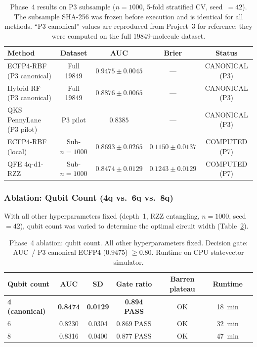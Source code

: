 \begin{table}[htbp]
\centering
\caption{Phase~4 results on P3 subsample ($n = 1000$, 5-fold stratified CV,
seed~$= 42$). The subsample SHA-256 was frozen before execution
and is identical for all methods.
``P3 canonical'' values are reproduced from Project~3\protect\cite{sao2026p3}
for reference; they were computed on the full \num{19849}-molecule dataset.}
\label{tab:phase4_results}
\begin{tabular}{lcccc}
\toprule
Method & Dataset & AUC & Brier & Status \\
\midrule
ECFP4-RBF (P3 canonical)
  & Full \num{19849} & $0.9475 \pm 0.0045$ & --- & CANONICAL (P3) \\
Hybrid RF (P3 canonical)
  & Full \num{19849} & $0.8876 \pm 0.0065$ & --- & CANONICAL (P3) \\
QKS PennyLane (P3 pilot)
  & P3 pilot & $0.8385$ & --- & CANONICAL (P3) \\
\midrule
ECFP4-RBF (local)
  & Sub-$n = 1000$ & $0.8693 \pm 0.0265$ & $0.1150 \pm 0.0137$ & COMPUTED (P7) \\
QFE 4q-d1-RZZ
  & Sub-$n = 1000$ & $\mathbf{0.8474 \pm 0.0129}$ & $0.1243 \pm 0.0129$ & COMPUTED (P7) \\
\bottomrule
\end{tabular}
\end{table}

\subsubsection{Ablation: Qubit Count (4q vs.\ 6q vs.\ 8q)}

With all other hyperparameters fixed (depth~1, RZZ entangling, $n = 1000$,
seed~$= 42$), qubit count was varied to determine the optimal circuit width
(Table~\ref{tab:ablation}).

\begin{table}[htbp]
\centering
\caption{Phase~4 ablation: qubit count. All other hyperparameters fixed.
Decision gate: AUC~/ P3 canonical ECFP4 ($0.9475$) $\geq 0.80$.
Runtime on CPU statevector simulator.}
\label{tab:ablation}
\begin{tabular}{lcccccc}
\toprule
Qubit count & AUC & SD & Gate ratio & Barren plateau & Runtime \\
\midrule
\textbf{4 (canonical)} & \textbf{0.8474} & \textbf{0.0129} & \textbf{0.894 PASS} & OK & \qty{18}{\minute} \\
6 & 0.8230 & 0.0304 & 0.869 PASS & OK & \qty{32}{\minute} \\
8 & 0.8316 & 0.0400 & 0.877 PASS & OK & \qty{47}{\minute} \\
\bottomrule
\end{tabular}
\end{table}

